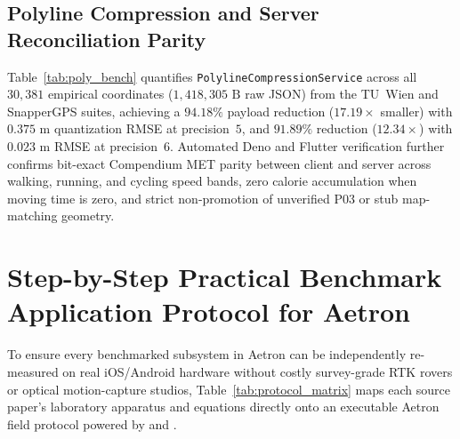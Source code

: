 \documentclass[journal]{IEEEtran}
\begin{document}
\subsection{Polyline Compression and Server Reconciliation Parity}
Table~\ref{tab:poly_bench} quantifies \texttt{PolylineCompressionService} across all $30{,}381$ empirical coordinates ($1{,}418{,}305\text{ B}$ raw JSON) from the TU~Wien and SnapperGPS suites, achieving a $\mathbf{94.18\%}$ payload reduction ($17.19\times$ smaller) with $0.375\text{ m}$ quantization RMSE at precision~$5$, and $\mathbf{91.89\%}$ reduction ($12.34\times$) with $0.023\text{ m}$ RMSE at precision~$6$. Automated Deno and Flutter verification further confirms bit-exact Compendium MET parity between client and server across walking, running, and cycling speed bands, zero calorie accumulation when moving time is zero, and strict non-promotion of unverified P03 or stub map-matching geometry.

\begin{table}[t]
\centering
\caption{Empirical Google Encoded Polyline Compression on $30{,}381$ Benchmark Coordinates ($1{,}418{,}305\text{ B}$ Raw JSON)}
\label{tab:poly_bench}
\renewcommand{\arraystretch}{1.15}
\end{table}

\section{Step-by-Step Practical Benchmark Application Protocol for Aetron}

To ensure every benchmarked subsystem in Aetron can be independently re-measured on real iOS/Android hardware without costly survey-grade RTK rovers or optical motion-capture studios, Table~\ref{tab:protocol_matrix} maps each source paper's laboratory apparatus and equations directly onto an executable Aetron field protocol powered by  and .
\end{document}
